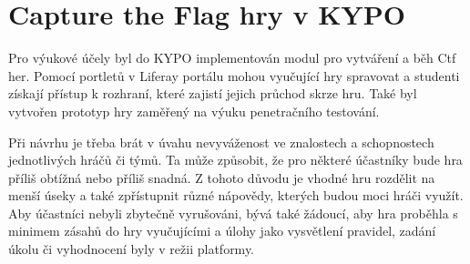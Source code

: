 \documentclass[
  digital, %
  oneside, %
  table,   %
  nolof,     %
  nolot,     %
]{fithesis3}
\begin{document}
\section{Capture the Flag hry v KYPO} \label{ctfGamesKYPO}
Pro výukové účely byl do KYPO implementován modul pro vytváření a běh Ctf her. Pomocí portletů v Liferay portálu mohou vyučující hry spravovat a studenti získají přístup k rozhraní, které zajistí jejich průchod skrze hru. Také byl vytvořen prototyp hry zaměřený na výuku penetračního testování.\par
Při návrhu je třeba brát v úvahu nevyváženost ve znalostech a schopnostech jednotlivých hráčů či týmů. Ta může způsobit, že pro některé účastníky bude hra příliš obtížná nebo příliš snadná. Z tohoto důvodu je vhodné hru rozdělit na menší úseky a také zpřístupnit různé nápovědy, kterých budou moci hráči využít. Aby účastníci nebyli zbytečně vyrušováni, bývá také žádoucí, aby hra proběhla s minimem zásahů do hry vyučujícími a úlohy jako vysvětlení pravidel, zadání úkolu či vyhodnocení byly v režii platformy.\cite{ctfDesign} 
\end{document}
